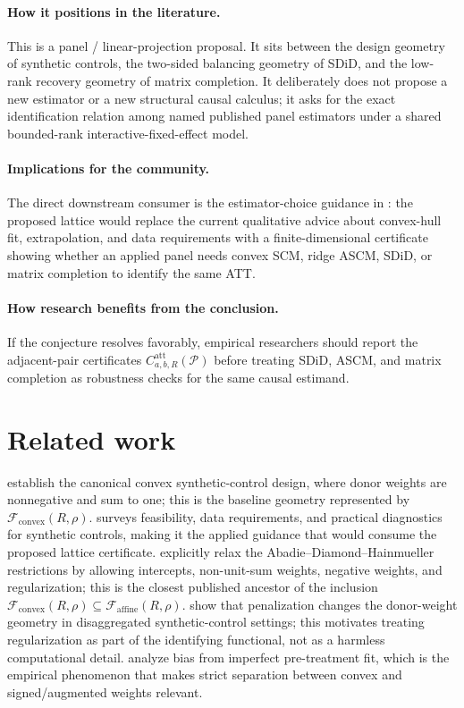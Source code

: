 \documentclass[11pt]{article}
\newcommand{\calF}{\mathcal{F}}
\theoremstyle{definition}
\theoremstyle{plain}
\theoremstyle{remark}
\begin{document}
\paragraph{How it positions in the literature.}
This is a panel / linear-projection proposal. It sits between the design geometry of synthetic controls, the two-sided balancing geometry of SDiD, and the low-rank recovery geometry of matrix completion. It deliberately does not propose a new estimator or a new structural causal calculus; it asks for the exact identification relation among named published panel estimators under a shared bounded-rank interactive-fixed-effect model.

\paragraph{Implications for the community.}
The direct downstream consumer is the estimator-choice guidance in \citet{Abadie2021}: the proposed lattice would replace the current qualitative advice about convex-hull fit, extrapolation, and data requirements with a finite-dimensional certificate showing whether an applied panel needs convex SCM, ridge ASCM, SDiD, or matrix completion to identify the same ATT.

\paragraph{How research benefits from the conclusion.}
If the conjecture resolves favorably, empirical researchers should report the adjacent-pair certificates \(C^{\mathrm{att}}_{a,b,R}(\mathcal P)\) before treating SDiD, ASCM, and matrix completion as robustness checks for the same causal estimand.

\section{Related work}

\citet{AbadieDiamondHainmueller2010} establish the canonical convex synthetic-control design, where donor weights are nonnegative and sum to one; this is the baseline geometry represented by \(\calF_{\mathrm{convex}}(R,\rho)\). \citet{Abadie2021} surveys feasibility, data requirements, and practical diagnostics for synthetic controls, making it the applied guidance that would consume the proposed lattice certificate. \citet{DoudchenkoImbens2016} explicitly relax the Abadie--Diamond--Hainmueller restrictions by allowing intercepts, non-unit-sum weights, negative weights, and regularization; this is the closest published ancestor of the inclusion \(\calF_{\mathrm{convex}}(R,\rho)\subseteq\calF_{\mathrm{affine}}(R,\rho)\). \citet{AbadieLHour2021} show that penalization changes the donor-weight geometry in disaggregated synthetic-control settings; this motivates treating regularization as part of the identifying functional, not as a harmless computational detail. \citet{FermanPinto2021} analyze bias from imperfect pre-treatment fit, which is the empirical phenomenon that makes strict separation between convex and signed/augmented weights relevant.
\end{document}
